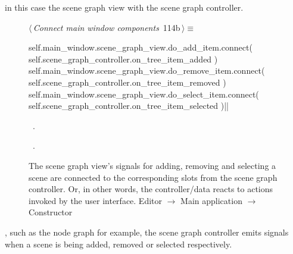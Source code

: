 \documentclass[%
    a4paper,    %
    justified,  %
    nobib,      %
    openany     %
]{tufte-book}
\makeatletter
\renewcommand{\label}[1]{\@tufte@label{##1}}%
\makeatother
\begin{document}
 in
this case the scene graph view with the scene graph controller.

\begin{figure}[!htbp]
\begin{flushleft} \small
\begin{minipage}{\linewidth}\label{scrap52}\raggedright\small
{} $\langle\,${\itshape Connect main window components}\nobreak\ {\footnotesize {114b}}$\,\rangle\equiv$
\vspace{-1ex}
\begin{pythoncode}
self.main_window.scene_graph_view.do_add_item.connect(
    self.scene_graph_controller.on_tree_item_added
)
self.main_window.scene_graph_view.do_remove_item.connect(
    self.scene_graph_controller.on_tree_item_removed
)
self.main_window.scene_graph_view.do_select_item.connect(
    self.scene_graph_controller.on_tree_item_selected
)|\NWsep|
\end{pythoncode}
\vspace{1.5ex}
\footnotesize
\begin{list}{}{\setlength{\itemsep}{-\parsep}\setlength{\itemindent}{-\leftmargin}}
\item \NWtxtMacroDefBy\ .
\item \NWtxtMacroRefIn\ .

\item{}
\end{list}
\end{minipage}\vspace{4ex}
\end{flushleft}
\caption{The scene graph view's signals for adding, removing and selecting a
  scene are connected to the corresponding slots from the scene graph
  controller. Or, in other words, the controller/data reacts to actions invoked
  by the user interface.
  \newline{}\newline{}Editor $\rightarrow$ Main application
  $\rightarrow$ Constructor}
\end{figure}

, such as the node
graph for example, the scene graph controller emits signals when a scene is
being added, removed or selected respectively.
\end{document}
